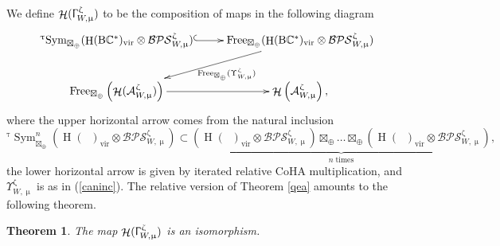 \documentclass[a4paper,10pt]{amsart}
\renewcommand{\zeta}{\upzeta}
\renewcommand{\Gamma}{\Upgamma}
\renewcommand{\tau}{\uptau}
\renewcommand{\mu}{\upmu}
\newtheorem{theorem}{Theorem}[section]
\DeclareMathOperator{\BC}{B\mathbb{C}^*}
\newcommand{\DTS}{\mathcal{BPS}}
\DeclareMathOperator{\Free}{Free}
\DeclareMathOperator{\Sym}{Sym}
\DeclareMathOperator{\vir}{vir}
\DeclareMathOperator{\Ho}{\mathcal{H}}
\DeclareMathOperator{\HO}{H}
\begin{document}
We define $\Ho(\Gamma_{W,\mu}^{\zeta})$ to be the composition of maps in the following diagram
\[
\xymatrix{
{}^{\tau}\!\Sym_{\boxtimes_{\oplus}}(\HO(\BC )_{\vir}\otimes\DTS_{W,\mu}^{\zeta})\ar@{^(->}[r]& \Free_{\boxtimes_{\oplus}}(\HO(\BC )_{\vir}\otimes\DTS_{W,\mu}^{\zeta})\ar[dl]^-{\;\;\;\Free_{\boxtimes_{\oplus}}(\Upsilon_{W,\mu}^{\zeta})}\\
 \Free_{\boxtimes_{\oplus}}\left(\Ho(\mathcal{A}_{W,\mu}^{\zeta})\right)\ar[r]&\Ho\left(\mathcal{A}_{W,\mu}^{\zeta}\right),
}
\]
where the upper horizontal arrow comes from the natural inclusion 
\[
{}^{\tau}\!\Sym^n_{\boxtimes_{\oplus}}(\HO(\BC )_{\vir}\otimes \DTS_{W,\mu}^{\zeta})\subset \underbrace{\left(\HO(\BC )_{\vir}\otimes\DTS_{W,\mu}^{\zeta}\right)\boxtimes_{\oplus}\ldots\boxtimes_{\oplus}\left(\HO(\BC )_{\vir}\otimes\DTS_{W,\mu}^{\zeta}\right)}_{n \;\textrm{times}},
\]
the lower horizontal arrow is given by iterated relative CoHA multiplication, and $\Upsilon_{W,\mu}^{\zeta}$ is as in (\ref{caninc}).  The relative version of Theorem \ref{qea} amounts to the following theorem.
\begin{theorem}
\label{zPBW}
The map $\Ho(\Gamma_{W,\mu}^{\zeta})$ is an isomorphism.
\end{theorem}
\end{document}
